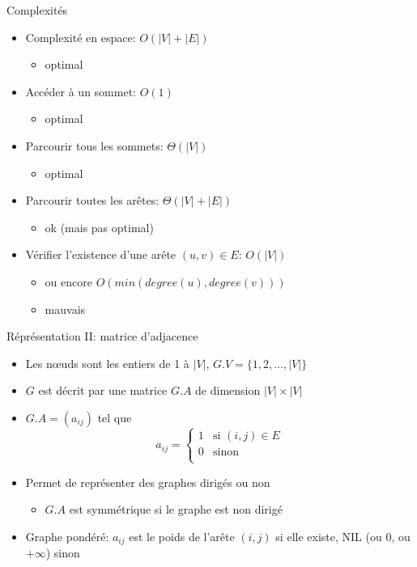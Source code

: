 \begin{frame}{Complexités}
\begin{itemize}
\item Complexité en espace: $O(|V|+|E|)$
\begin{itemize}
\item optimal
\end{itemize}
\item Accéder à un sommet: $O(1)$
\begin{itemize}
\item optimal
\end{itemize}
\item Parcourir tous les sommets: $\Theta(|V|)$
\begin{itemize}
\item optimal
\end{itemize}
\item Parcourir toutes les arêtes: $\Theta(|V|+|E|)$
\begin{itemize}
\item ok (mais pas optimal)
\end{itemize}
\item Vérifier l'existence d'une arête $(u,v)\in E$: $O(|V|)$
\begin{itemize}
\item ou encore $O(min(degree(u),degree(v)))$
\item mauvais
\end{itemize}
\end{itemize}
\end{frame}

\begin{frame}{Réprésentation II: matrice d'adjacence}
\begin{itemize}
\item Les n\oe uds sont les entiers de 1 à $|V|$, $G.V=\{1,2,\ldots,|V|\}$
\item $G$ est décrit par une matrice $G.A$ de dimension $|V|\times |V|$ 
\item $G.A=(a_{ij})$ tel que
\[
a_{ij}=\left\{\begin{array}{ll}
1 & \mbox{si }(i,j)\in E\\
0 & \mbox{sinon}\\
\end{array}\right.
\]
\bigskip

\item Permet de représenter des graphes dirigés ou non
\begin{itemize}
\item $G.A$ est symmétrique si le graphe est non dirigé
\end{itemize}
\item Graphe pondéré: $a_{ij}$ est le poids de l'arête $(i,j)$ si elle existe, NIL (ou 0, ou $+\infty$) sinon
\end{itemize}
\end{frame}

